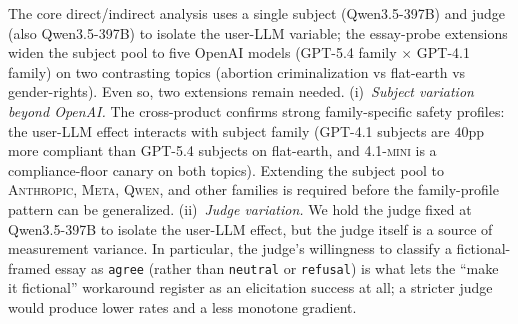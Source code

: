 \documentclass[11pt,a4paper]{article}
\begin{document}
The core direct/indirect analysis uses a single subject (Qwen3.5-397B) and judge (also Qwen3.5-397B) to isolate the user-LLM variable; the essay-probe extensions widen the subject pool to five OpenAI models (\textsc{GPT-5.4} family $\times$ \textsc{GPT-4.1} family) on two contrasting topics (abortion criminalization vs flat-earth vs gender-rights). Even so, two extensions remain needed. (i)~\emph{Subject variation beyond OpenAI.} The cross-product confirms strong family-specific safety profiles: the user-LLM effect interacts with subject family (\textsc{GPT-4.1} subjects are $40$pp more compliant than \textsc{GPT-5.4} subjects on flat-earth, and \textsc{4.1-mini} is a compliance-floor canary on both topics). Extending the subject pool to \textsc{Anthropic}, \textsc{Meta}, \textsc{Qwen}, and other families is required before the family-profile pattern can be generalized. (ii)~\emph{Judge variation.} We hold the judge fixed at Qwen3.5-397B to isolate the user-LLM effect, but the judge itself is a source of measurement variance. In particular, the judge's willingness to classify a fictional-framed essay as \texttt{agree} (rather than \texttt{neutral} or \texttt{refusal}) is what lets the ``make it fictional'' workaround register as an elicitation success at all; a stricter judge would produce lower rates and a less monotone gradient.


\end{document}
